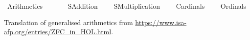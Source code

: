%
\begin{isabellebody}%
%
%
\isadelimtheory
%
\endisadelimtheory
%
\isatagtheory
\isanewline
\isanewline
{}\isamarkupfalse%
\ Arithmetics\isanewline
\ \ \isanewline
\ \ \ \ SAddition\isanewline
\ \ \ \ SMultiplication\isanewline
\ \ \ \ Cardinals\isanewline
\ \ \ \ Ordinals\isanewline
{}%
\endisatagtheory
{\isafoldtheory}%
%
\isadelimtheory
%
\endisadelimtheory
%
\isadelimdocument
%
\endisadelimdocument
%
\isatagdocument
%
\isamarkuptrue%
%
\endisatagdocument
{\isafolddocument}%
%
\isadelimdocument
%
\endisadelimdocument
%
\begin{isamarkuptext}%
Translation of generalised arithmetics from
\url{https://www.isa-afp.org/entries/ZFC_in_HOL.html}.%
\end{isamarkuptext}\isamarkuptrue%
%
\isadelimtheory
%
\endisadelimtheory
%
\isatagtheory
{}\isamarkupfalse%
%
\endisatagtheory
{\isafoldtheory}%
%
\isadelimtheory
%
\endisadelimtheory
%
\end{isabellebody}%
\endinput
